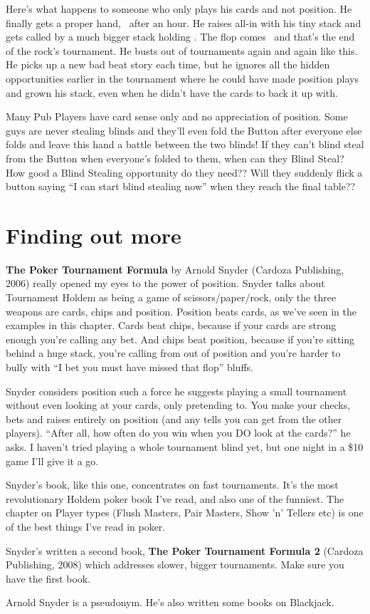 Here's what happens to someone who only plays his cards and not position.
He finally gets a proper hand, \tenh\tenc\ after an hour. He raises all-in
with his tiny stack and gets called by a much bigger stack
holding \Kd\Qd. The flop comes \Kh\sixc\trec\ and that's the
end of the rock's tournament. He busts out of tournaments again and
again like this. He picks up a new bad beat story each time, but he
ignores all the hidden opportunities earlier in the tournament
where he could have made position plays and grown his stack,
even when he didn't have the cards to back it up with.

Many Pub Players have card sense only and no appreciation of position.
Some guys are never stealing blinds and they'll even fold the
Button after everyone else folds and leave this hand a battle between the
two blinds! If they can't blind steal from the Button when everyone's
folded to them, when can they Blind Steal? How good a Blind Stealing
opportunity do they need?? Will they suddenly flick a button saying
``I can start blind stealing now'' when they reach the final table??

\section{Finding out more}

\textbf{The Poker Tournament Formula} by Arnold Snyder
(Cardoza Publishing, 2006) really opened my eyes to the power of position.
Snyder talks about
Tournament Holdem as being a game of scissors/paper/rock, only the
three weapons are cards, chips and position. Position beats cards, as we've
seen in the examples in this chapter. Cards beat chips, because if your
cards are strong enough you're calling any bet. And chips beat position,
because if you're sitting behind a huge stack, you're calling
from out of position and you're harder to bully with ``I bet you
must have missed that flop'' bluffs.

Snyder considers position such a force he suggests playing a small
tournament without even looking at your cards, only pretending to. You make
your checks, bets and raises entirely on position (and any tells you can
get from the other players). ``After all, how often do you win when you
DO look at the cards?'' he asks. I haven't tried playing a whole tournament
blind yet, but one night in a \$10 game I'll give it a go.

Snyder's book, like this one, concentrates on fast tournaments. It's
the most revolutionary Holdem poker book I've read, and also one of
the funniest. The chapter on Player types (Flush Masters, Pair Masters,
Show 'n' Tellers etc) is one of the best things I've read in poker.

Snyder's written a second book, \textbf{The Poker Tournament Formula 2}
(Cardoza Publishing, 2008) which addresses slower, bigger
tournaments. Make sure you have the first book.

Arnold Snyder is a pseudonym. He's also written some books on Blackjack.
